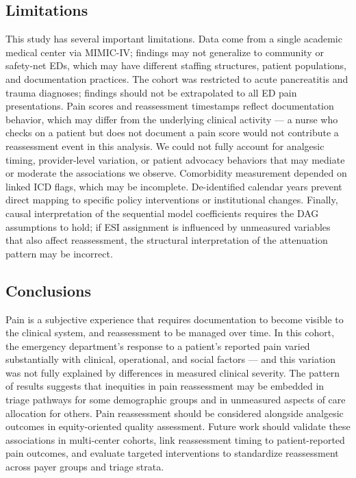 \subsection{Limitations}

This study has several important limitations.
Data come from a single academic medical center via MIMIC-IV; findings may not generalize to community or safety-net EDs, which may have different staffing structures, patient populations, and documentation practices.
The cohort was restricted to acute pancreatitis and trauma diagnoses; findings should not be extrapolated to all ED pain presentations.
Pain scores and reassessment timestamps reflect documentation behavior, which may differ from the underlying clinical activity --- a nurse who checks on a patient but does not document a pain score would not contribute a reassessment event in this analysis.
We could not fully account for analgesic timing, provider-level variation, or patient advocacy behaviors that may mediate or moderate the associations we observe.
Comorbidity measurement depended on linked ICD flags, which may be incomplete.
De-identified calendar years prevent direct mapping to specific policy interventions or institutional changes.
Finally, causal interpretation of the sequential model coefficients requires the DAG assumptions to hold; if ESI assignment is influenced by unmeasured variables that also affect reassessment, the structural interpretation of the attenuation pattern may be incorrect.

\subsection{Conclusions}

Pain is a subjective experience that requires documentation to become visible to the clinical system, and reassessment to be managed over time.
In this cohort, the emergency department's response to a patient's reported pain varied substantially with clinical, operational, and social factors --- and this variation was not fully explained by differences in measured clinical severity.
The pattern of results suggests that inequities in pain reassessment may be embedded in triage pathways for some demographic groups and in unmeasured aspects of care allocation for others.
Pain reassessment should be considered alongside analgesic outcomes in equity-oriented quality assessment.
Future work should validate these associations in multi-center cohorts, link reassessment timing to patient-reported pain outcomes, and evaluate targeted interventions to standardize reassessment across payer groups and triage strata.
